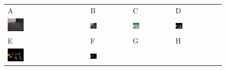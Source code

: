 \begin{figure}[t]
    \renewcommand{\arraystretch}{2.0}
    \begin{tabular}{@{}l@{}p{}@{}l@{}p{}@{}l@{}p{}@{}l@{}p{}@{}l@{}}
      A & & B & & C & & D \\
      \includegraphics[width=0.23\textwidth]{figures/vision-system-object-perception-1} & &
      \includegraphics[width=0.23\textwidth]{figures/vision-system-object-perception-2} & &
      \includegraphics[width=0.23\textwidth]{figures/vision-system-object-perception-3} & &
      \includegraphics[width=0.23\textwidth]{figures/vision-system-object-perception-4} \\
      E & & F & & G & & H \\
      \includegraphics[width=0.23\textwidth]{figures/vision-system-object-perception-5} & &
      \includegraphics[width=0.23\textwidth]{figures/vision-system-object-perception-6} & &

\end{tabular}
\end{figure}
